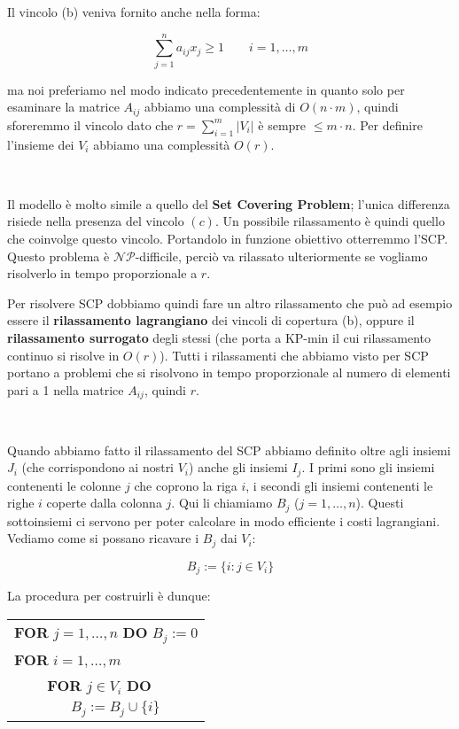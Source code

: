 \documentclass[11pt]{book}
\begin{document}
Il vincolo (b) veniva fornito anche nella forma:

$$
\sum\limits_{j=1}^n a_{ij}x_j \geq 1 \qquad i=1,\dots,m
$$

ma noi preferiamo nel modo indicato precedentemente in quanto solo per
esaminare la matrice $A_{ij}$ abbiamo una complessit\`a di $O(n\cdot
m)$, quindi sfo\-re\-rem\-mo il vincolo dato che $r = \sum_{i=1}^m |V_i|$
\`e sempre $\leq m\cdot n$. Per definire l'insieme dei $V_i$ abbiamo una
complessit\`a $O(r)$. 

\

Il modello \`e molto simile a quello del \textbf{Set Covering
  Problem}; l'unica differenza risiede nella presenza del vincolo
$(c)$. Un possibile rilassamento \`e quindi quello che coinvolge
questo vincolo. Portandolo in funzione obiettivo otterremmo
l'SCP. Questo problema \`e $\mathcal{NP}$-difficile, perci\`o va
rilassato ulteriormente se vogliamo risolverlo in tempo proporzionale
a $r$.

Per risolvere SCP dobbiamo quindi fare un altro rilassamento che pu\`o
ad esempio essere il \textbf{rilassamento lagrangiano} dei vincoli di
copertura (b), oppure il \textbf{rilassamento surrogato} degli stessi
(che porta a KP-min il cui rilassamento continuo si risolve in
$O(r)$). Tutti i rilassamenti che abbiamo visto per SCP portano a
problemi che si risolvono in tempo proporzionale al numero di elementi
pari a 1 nella matrice $A_{ij}$, quindi $r$.

\

Quando abbiamo fatto il rilassamento del SCP abbiamo definito oltre
agli insiemi $J_i$ (che corrispondono ai nostri $V_i$) anche gli
insiemi $I_j$. I primi sono gli insiemi contenenti le colonne $j$ che
coprono la riga $i$, i secondi gli insiemi contenenti le righe $i$
coperte dalla colonna $j$. Qui li chiamiamo $B_j$
($j=1,\dots,n$). Questi sottoinsiemi ci servono per poter calcolare in
modo efficiente i costi lagrangiani. Vediamo come si possano ricavare
i $B_j$ dai $V_i$:

$$
B_j := \{ i : j\in V_i\}
$$

La procedura per costruirli \`e dunque:

\vspace{20pt}
\begin{tabular}{l}
\textbf{FOR} $j=1,\dots,n$ \textbf{DO} $B_j := 0$\\
\textbf{FOR} $i=1,\dots,m$ \\
$\qquad$ \textbf{FOR} $j \in V_i$ \textbf{DO}\\
$\qquad\qquad B_j := B_j \cup \{i\}$\\
\end{tabular}
\vspace{20pt}
\end{document}
